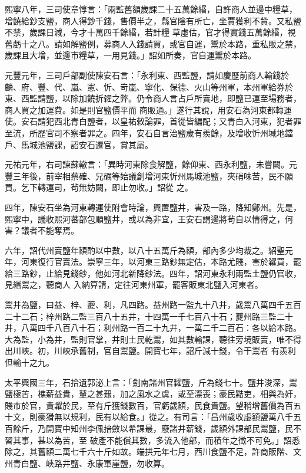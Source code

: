 \begin{pinyinscope}
 熙寧八年，三司使章惇言：「兩監舊額歲課二十五萬餘緡，自許商人並邊中糧草，增饒給鈔支鹽，商人得鈔千錢，售價半之，縣官陰有所亡，坐賈獲利不貲。又私鹽不禁，歲課日減，今才十萬四千餘緡，若計糧
 草虛估，官才得實錢五萬餘緡，視舊虧十之八。請如解鹽例，募商人入錢請買，或官自運，鬻於本路，重私販之禁，歲課且大增，並邊市糧草，一用見錢。」詔如所奏，官自運鬻於本路。



 元豐元年，三司戶部副使陳安石言：「永利東、西監鹽，請如慶歷前商人輸錢於麟、府、豐、代、嵐、憲、忻、岢嵐、寧化、保德、火山等州軍，本州軍給券於東、西監請鹽，以除加饒折糴之弊。仍令商人言占戶所賣地，即鹽已運至場務者，商人買之加運費。如是則官鹽價平而
 商販通。」遂行其說，用安石為河東都轉運使。安石請犯西北青白鹽者，以皇祐敕論罪，首從皆編配；又青白入河東，犯者罪至流，所歷官司不察者罪之。四年，安石自言治鹽歲有羨餘，及增收忻州堿地鐺戶、馬城池鹽課，詔安石遷官，賞其屬。



 元祐元年，右司諫蘇轍言：「異時河東除食解鹽，餘仰東、西永利鹽，未嘗闕。元豐三年後，前宰相蔡確、兄礪等始議創增河東忻州馬城池鹽，夾硝味苦，民不願買。乞下轉運司，茍無妨闕，即止勿收。」詔從
 之。



 四年，陳安石坐為河東轉運使附會時論，興置鹽井，害及一路，降知鄭州。先是，熙寧中，議收熙河蕃部包順鹽井，或以為非宜，王安石謂邊將茍自以情得之，何害？議者不能奪焉。



 六年，詔代州賣鹽年額酌以中數，以八十五萬斤為額，部內多少均裁之。紹聖元年，河東復行官賣法。崇寧三年，以河東三路鈔無定估，本路尤賤，害於糴買，罷給三路鈔，止給見錢鈔，他如河北新降鈔法。四年，詔河東永利兩監土鹽仍官收，見緡鬻之，聽商人
 入納算請，定往河東州軍，罷客販東北鹽入河東者。



 鬻井為鹽，曰益、梓、夔、利，凡四路。益州路一監九十八井，歲鬻八萬四千五百二十二石；梓州路二監三百八十五井，十四萬一千七百八十石；夔州路三監二十井，八萬四千八百八十石；利州路一百二十九井，一萬二千二百石：各以給本路。大為監，小為井，監則官掌，井則土民乾鬻，如其數輸課，聽往旁境販賣，唯不得出川峽。初，川峽承舊制，官自鬻鹽。開寶七年，詔斤減十錢，令干鬻者
 有羨利但輸十之九。



 太平興國三年，石拾遺郭泌上言：「劍南諸州官糶鹽，斤為錢七十。鹽井浚深，鬻鹽極苦，樵薪益貴，輦之甚艱，加之風水之虞，或至漂喪；豪民黠吏，相與為奸，賤市於官，貴糶於民，至有斤獲錢數百，官虧歲額，民食貴鹽。望稍增舊價為百五十文，則豪猾無以規利，民有以給食。」從之。有司言：「昌州歲收虛額鹽萬八千五百餘斤，乃開寶中知州李佩掊斂以希課最，廢諸井薪錢，歲額外課部民鬻鹽，民不習其事，甚以為苦，至
 破產不能償其數，多流入他部，而積年之徵不可免。」詔悉除之，其舊額二萬七千六十斤如故。端拱元年七月，西川食鹽不足，許商販階、文州青白鹽、峽路井鹽、永康軍崖鹽，勿收算。




\end{pinyinscope}
